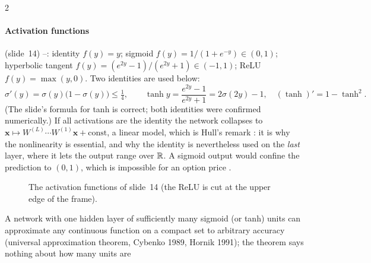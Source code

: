 \begin{paracol}{2}
\paragraph{Activation functions} (slide~14) --: identity $f(y)=y$; sigmoid $f(y)=1/(1+e^{-y})\in(0,1)$; hyperbolic tangent
$f(y)=(e^{2y}-1)/(e^{2y}+1)\in(-1,1)$; ReLU $f(y)=\max(y,0)$. Two identities are used below:
\[
  \sigma'(y)=\sigma(y)\bigl(1-\sigma(y)\bigr)\le\tfrac14,\qquad
  \tanh y=\frac{e^{2y}-1}{e^{2y}+1}=2\sigma(2y)-1,\quad(\tanh)'=1-\tanh^2 .
\]
(The slide's formula for tanh is correct; both identities were confirmed numerically.) If all activations are the identity the network collapses to $\bm x\mapsto W^{(L)}\cdots W^{(1)}\bm x+\text{const}$, a linear model, which is Hull's remark
: it is why the nonlinearity is essential, and why the identity is nevertheless used on the \emph{last} layer, where it lets the output range over $\mathbb{R}$. A sigmoid output would confine the prediction to $(0,1)$, which is impossible for an option price
.
\begin{figure}[ht]
\centering
{}
\caption{The activation functions of slide~14 (the ReLU is cut at the upper edge of the frame).}\label{ch16:fig-act}
\end{figure}
\begin{remark}
A network with one hidden layer of sufficiently many sigmoid (or tanh) units can approximate any continuous function on a compact set to arbitrary accuracy (universal approximation theorem, Cybenko 1989, Hornik 1991); the theorem says nothing about how many units are

\end{remark}
\end{paracol}
